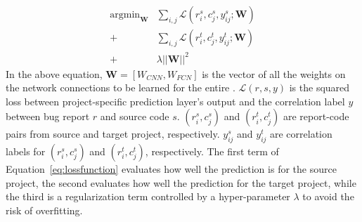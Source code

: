 







\begin{equation}
\begin{aligned}
\label{eq:lossfunction}
\mathop{\arg\min}_{\mathbf{W}}&\sum_{i,j}\mathcal{L}(r^s_i,c^s_j,y^s_{ij}; \mathbf{W}) \\
+&\sum_{i,j}\mathcal{L}(r^t_i,c^t_j,y^t_{ij}; \mathbf{W}) \\
+&\lambda||\mathbf{W}||^2
\end{aligned}
\end{equation}
%
In the above equation, $\mathbf{W} = [W_{CNN}, W_{FCN}]$ is the vector of all the weights on the network connections to be learned for the entire \TRANPCNN. $\mathcal{L}(r,s,y)$ is the squared loss between project-specific prediction layer's output and the correlation label $y$ between bug report $r$ and source code $s$. $(r^s_i, c^s_j)$ and $(r^t_i, c^t_j)$ are report-code pairs from source and target project, respectively.  $y^s_{ij}$ and $y^t_{ij}$ are correlation labels for $(r^s_i, c^s_j)$ and $(r^t_i, c^t_j)$, respectively. The first term of Equation~\ref{eq:lossfunction} evaluates how well the prediction is for the source project, the second evaluates how well the prediction for the target project, while the third is a regularization term controlled by a hyper-parameter $\lambda$ to avoid the risk of overfitting.

